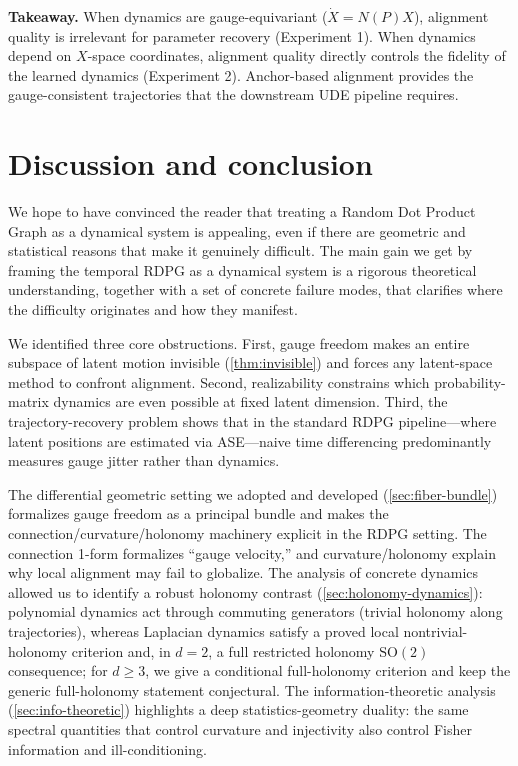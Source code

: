 \documentclass{article}
\theoremstyle{plain}
\theoremstyle{definition}
\theoremstyle{remark}
\begin{document}
\textbf{Takeaway.}
When dynamics are gauge-equivariant ($\dot{X} = N(P) X$), alignment quality is irrelevant for parameter recovery (Experiment 1).
When dynamics depend on $X$-space coordinates, alignment quality directly controls the fidelity of the learned dynamics (Experiment 2).
Anchor-based alignment provides the gauge-consistent trajectories that the downstream UDE pipeline requires.



\section{Discussion and conclusion}\label{sec:discussion}

We hope to have convinced the reader that treating a Random Dot Product Graph as a dynamical system is appealing, even if there are geometric and statistical reasons that make it genuinely difficult.
The main gain we get by framing the temporal RDPG as a dynamical system is a rigorous theoretical understanding, together with a set of concrete failure modes, that clarifies where the difficulty originates and how they manifest.

We identified three core obstructions.
First, gauge freedom makes an entire subspace of latent motion invisible (\cref{thm:invisible}) and forces any latent-space method to confront alignment.
Second, realizability constrains which probability-matrix dynamics are even possible at fixed latent dimension.
Third, the trajectory-recovery problem shows that in the standard RDPG pipeline---where latent positions are estimated via ASE---naive time differencing predominantly measures gauge jitter rather than dynamics.

The differential geometric setting we adopted and developed (\cref{sec:fiber-bundle}) formalizes gauge freedom as a principal bundle and makes the connection/curvature/holonomy machinery explicit in the RDPG setting.
The connection 1-form formalizes ``gauge velocity,'' and curvature/holonomy explain why local alignment may fail to globalize.
The analysis of concrete dynamics allowed us to identify a robust holonomy contrast (\cref{sec:holonomy-dynamics}): polynomial dynamics act through commuting generators (trivial holonomy along trajectories), whereas Laplacian dynamics satisfy a proved local nontrivial-holonomy criterion and, in $d=2$, a full restricted holonomy $\mathrm{SO}(2)$ consequence; for $d \ge 3$, we give a conditional full-holonomy criterion and keep the generic full-holonomy statement conjectural.
The information-theoretic analysis (\cref{sec:info-theoretic}) highlights a deep statistics-geometry duality: the same spectral quantities that control curvature and injectivity also control Fisher information and ill-conditioning.
\end{document}
